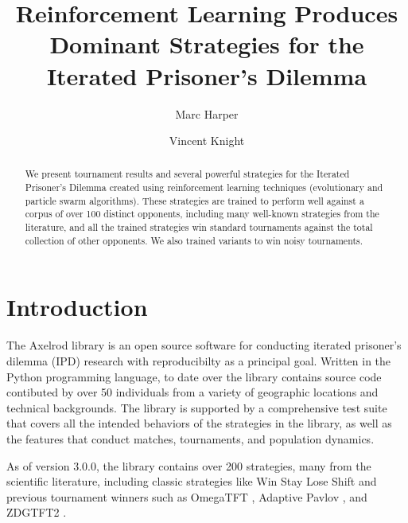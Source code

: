 \documentclass{article}
\title{Reinforcement Learning Produces Dominant Strategies for the
Iterated Prisoner's Dilemma}
\author{Marc Harper \and Vincent Knight} %
\date{}
\begin{document}
\maketitle

\begin{abstract}
    We present tournament results and several powerful strategies for the Iterated
    Prisoner's Dilemma created using reinforcement learning techniques
    (evolutionary and particle swarm algorithms). These strategies are
    trained to perform well against a corpus of over 100 distinct
    opponents, including many well-known strategies from the literature, and all
    the trained strategies win standard tournaments against the total collection
    of other opponents. We also trained variants to win noisy tournaments.
\end{abstract}

\section{Introduction}\label{sec:introduction}

The Axelrod library \cite{knight2016open} is an open source software for
conducting iterated prisoner's dilemma (IPD) research with reproducibilty as a
principal goal. Written in the Python programming language, to date over the
library contains source code contibuted by over 50 individuals from a variety
of geographic locations and technical backgrounds. The library is supported by
a comprehensive test suite that covers all the intended behaviors of the
strategies in the library, as well as the features that conduct matches,
tournaments, and population dynamics.

As of version 3.0.0, the library contains over 200 strategies,
many from the scientific literature, including classic strategies like Win Stay
Lose Shift \cite{nowak1993strategy} and previous tournament winners such as
OmegaTFT \cite{slany2007some}, Adaptive Pavlov \cite{li2007design}, and
ZDGTFT2 \cite{stewart2012extortion}.

\end{document}
